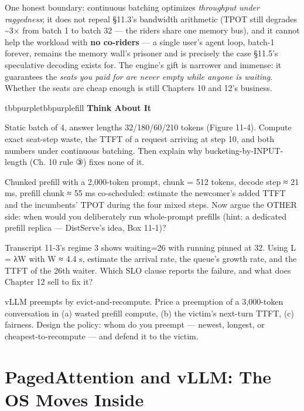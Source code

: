 One honest boundary: continuous batching optimizes \textit{throughput under raggedness}; it does not repeal §11.3's bandwidth arithmetic (TPOT still degrades \textasciitilde{}3× from batch 1 to batch 32 — the riders share one memory bus), and it cannot help the workload with \textbf{no co-riders} — a single user's agent loop, batch-1 forever, remains the memory wall's prisoner and is precisely the case §11.5's speculative decoding exists for. The engine's gift is narrower and immense: it guarantees the \textit{seats you paid for are never empty while anyone is waiting}. Whether the seats are cheap enough is still Chapters 10 and 12's business.

\begin{calloutbox}{tbbpurple}{tbbpurplefill}
{\normalsize\bfseries\color{tbbpurple}Think About It}\par\vspace{3pt}
\begin{tbbitemize}
  \item Static batch of 4, answer lengths 32/180/60/210 tokens (Figure 11-4). Compute exact seat-step waste, the TTFT of a request arriving at step 10, and both numbers under continuous batching. Then explain why bucketing-by-INPUT-length (Ch. 10 rule ③) fixes none of it.
  \item Chunked prefill with a 2,000-token prompt, chunk = 512 tokens, decode step ≈ 21 ms, prefill chunk ≈ 55 ms co-scheduled: estimate the newcomer's added TTFT and the incumbents' TPOT during the four mixed steps. Now argue the OTHER side: when would you deliberately run whole-prompt prefills (hint: a dedicated prefill replica — DistServe's idea, Box 11-1)?
  \item Transcript 11-3's regime 3 shows waiting=26 with running pinned at 32. Using L = λW with W ≈ 4.4 s, estimate the arrival rate, the queue's growth rate, and the TTFT of the 26th waiter. Which SLO clause reports the failure, and what does Chapter 12 sell to fix it?
  \item vLLM preempts by evict-and-recompute. Price a preemption of a 3,000-token conversation in (a) wasted prefill compute, (b) the victim's next-turn TTFT, (c) fairness. Design the policy: whom do you preempt — newest, longest, or cheapest-to-recompute — and defend it to the victim.
\end{tbbitemize}
\end{calloutbox}

\section{PagedAttention and vLLM: The OS Moves Inside}

